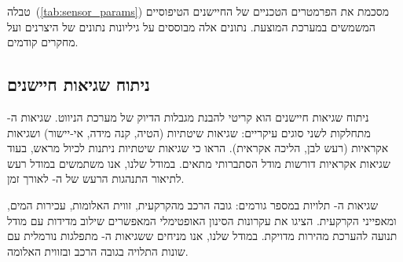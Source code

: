 \begin{table}[htbp]
    \centering
    \caption{פרמטרים טכניים של חיישנים טיפוסיים לרכב תת-ימי. (Technical parameters of typical underwater vehicle sensors.)}
    \label{tab:sensor_params}
\end{table}

טבלה~(\ref{tab:sensor_params}) מסכמת את הפרמטרים הטכניים של החיישנים הטיפוסיים המשמשים במערכת המוצעת. נתונים אלה מבוססים על גיליונות נתונים של היצרנים ועל מחקרים קודמים.

\subsection{ניתוח שגיאות חיישנים}
\label{sec:sensor_error_analysis}

ניתוח שגיאות חיישנים הוא קריטי להבנת מגבלות הדיוק של מערכת הניווט. שגיאות ה- מתחלקות לשני סוגים עיקריים: שגיאות שיטתיות (הטיה, קנה מידה, אי-יישור) ושגיאות אקראיות (רעש לבן, הליכה אקראית). \citet{Thrun2005ProbRobotics} הראו כי שגיאות שיטתיות ניתנות לכיול מראש, בעוד שגיאות אקראיות דורשות מודל הסתברותי מתאים. במודל שלנו, אנו משתמשים במודל רעש  לתיאור התנהגות הרעש של ה- לאורך זמן.

שגיאות ה- תלויות במספר גורמים: גובה הרכב מהקרקעית, זווית האלומות, עכירות המים, ומאפייני הקרקעית. \citet{Kalman1960} הציגו את עקרונות הסינון האופטימלי המאפשרים שילוב מדידות  עם מודל תנועה להערכת מהירות מדויקת. במודל שלנו, אנו מניחים ששגיאות ה- מתפלגות נורמלית עם שונות התלויה בגובה הרכב ובזווית האלומה.

